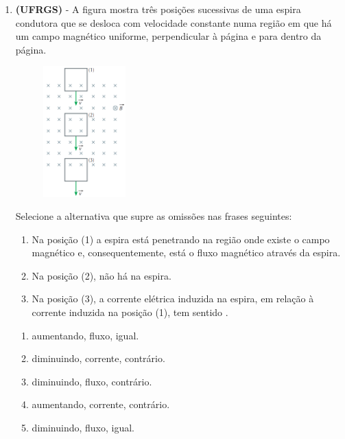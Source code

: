 \documentclass[12pt,letterpaper,fleqn]{article}
\begin{document}
\begin{enumerate}
        \item \textbf{(UFRGS)} - A figura mostra três posições sucessivas de uma espira condutora que se desloca com velocidade constante numa região em que há um campo magnético uniforme, perpendicular à página e para dentro da página.
        
        \begin{figure}[h]
            \centering
            \includegraphics[width=0.3\textwidth]{ex_2.png}
        \end{figure}
        
        Selecione a alternativa que supre as omissões nas frases seguintes:
        
        \begin{enumerate}
        \begin{enumerate}
            \item  Na posição (1) a espira está penetrando na região onde existe o campo magnético e, consequentemente, está \underline{\hspace{2cm}} o fluxo magnético através da espira.
            \item  Na posição (2), não há \underline{\hspace{2cm}} na espira.
            \item Na posição (3), a corrente elétrica induzida na espira, em relação à corrente induzida na posição (1), tem sentido \underline{\hspace{2cm}}.
        \end{enumerate}
        \end{enumerate}
        
        
        \begin{enumerate}
            \item aumentando, fluxo, igual.
            \item diminuindo, corrente, contrário.
            \item diminuindo, fluxo, contrário.
            \item aumentando, corrente, contrário.
            \item diminuindo, fluxo, igual.
        \end{enumerate}
        

\end{enumerate}
\end{document}
